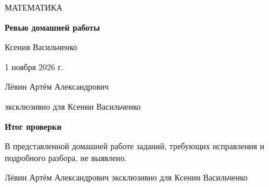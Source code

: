 \documentclass[a4paper,12pt]{article}
\begin{document}
\begin{titlepage}
\centering
\vspace*{37mm}
{\color{accent}\Large МАТЕМАТИКА\par}
\vspace{22mm}
{\bfseries\fontsize{25}{31}\selectfont Ревью домашней работы\par}
\vspace{12mm}
{\large Ксения Васильченко\par}
\vspace{7mm}
{\normalsize 1 ноября 2026 г.\par}
\vfill
{\small Лёвин Артём Александрович\par}
\vspace{3mm}
{\small\color{muted} эксклюзивно для Ксении Васильченко\par}
\vspace{16mm}
\end{titlepage}
\newpage
\vspace*{31mm}
\begin{center}
{\color{accent}\Large\bfseries Итог проверки\par}
\vspace{14mm}
\begin{minipage}{0.75\textwidth}
\centering
В представленной домашней работе заданий, требующих исправления и подробного разбора, не выявлено.
\end{minipage}
\end{center}
\vfill
\begin{center}
{\small\color{muted} Лёвин Артём Александрович эксклюзивно для Ксении Васильченко}
\end{center}
\end{document}
